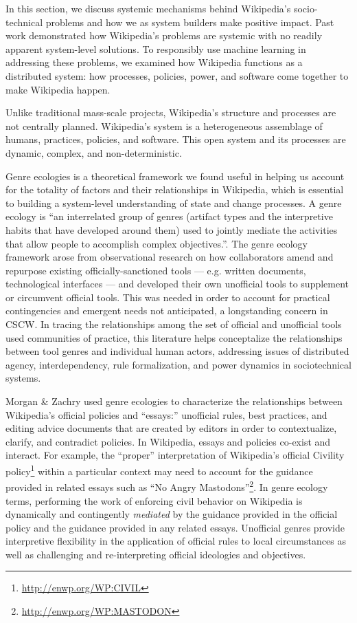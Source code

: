 In this section, we discuss systemic mechanisms behind Wikipedia's socio-technical problems and how we as system builders make positive impact.  Past work demonstrated how Wikipedia's problems are systemic with no readily apparent system-level solutions. To responsibly use machine learning in addressing these problems, we examined how Wikipedia functions as a distributed system: how processes, policies, power, and software come together to make Wikipedia happen.

Unlike traditional mass-scale projects, Wikipedia's structure and processes are not centrally planned. Wikipedia's system is a heterogeneous assemblage of humans, practices, policies, and software.  This open system and its processes are dynamic, complex, and non-deterministic.

Genre ecologies is a theoretical framework we found useful in helping us account for the totality of factors and their relationships in Wikipedia, which is essential to building a system-level understanding of state and change processes.  A genre ecology is ``an interrelated group of genres (artifact types and the interpretive habits that have developed around them) used to jointly mediate the activities that allow people to accomplish complex objectives.''\cite{spinuzzi2000genre}. The genre ecology framework arose from observational research on how collaborators amend and repurpose existing officially-sanctioned tools --- e.g. written documents, technological interfaces --- and developed their own unofficial tools to supplement or circumvent official tools. This was needed in order to account for practical contingencies and emergent needs not anticipated, a longstanding concern in CSCW. In tracing the relationships among the set of official and unofficial tools used communities of practice, this literature helps conceptalize the relationships between tool genres and individual human actors, addressing issues of distributed agency, interdependency, rule formalization, and power dynamics in sociotechnical systems\cite{spinuzzi2003tracing}.

Morgan \& Zachry used genre ecologies to characterize the relationships between Wikipedia's official policies and ``essays:'' unofficial rules, best practices, and editing advice documents that are created by editors in order to contextualize, clarify, and contradict policies\cite{morgan2010negotiating}. In Wikipedia, essays and policies co-exist and interact. For example, the ``proper'' interpretation of Wikipedia's official Civility policy\footnote{\url{http://enwp.org/WP:CIVIL}} within a particular context may need to account for the guidance provided in related essays such as ``No Angry Mastodons''\footnote{\url{http://enwp.org/WP:MASTODON}}. In genre ecology terms, performing the work of enforcing civil behavior on Wikipedia is dynamically and contingently \emph{mediated} by the guidance provided in the official policy and the guidance provided in any related essays. Unofficial genres provide interpretive flexibility in the application of official rules to local circumstances as well as challenging and re-interpreting official ideologies and objectives.

